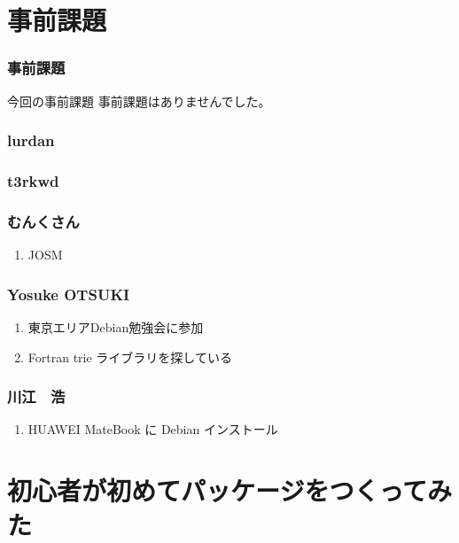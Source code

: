 \documentclass[cjk,dvipdfmx,10pt,compress,%
hyperref={bookmarks=true,bookmarksnumbered=true,bookmarksopen=false,%
colorlinks=false,%
pdftitle={第 114 回 関西 Debian 勉強会},%
pdfauthor={倉敷・のがた・佐々木・かわだ},%
pdfsubject={資料},%
}]{beamer}
\begin{document}

\section{事前課題}

\begin{frame}[fragile]
  \frametitle{事前課題}
  \begin{block}{今回の事前課題}
    事前課題はありませんでした。
  \end{block}
\end{frame}


\begin{frame}
  \frametitle{ lurdan }
\end{frame}

\begin{frame}
  \frametitle{ t3rkwd }
\end{frame}

\begin{frame}
  \frametitle{ むんくさん }
  \begin{enumerate}
  \item JOSM
  \end{enumerate}
\end{frame}

\begin{frame}
  \frametitle{ Yosuke OTSUKI }
  \begin{enumerate}
  \item 東京エリアDebian勉強会に参加
  \item Fortran trie ライブラリを探している
  \end{enumerate}
\end{frame}

\begin{frame}
  \frametitle{ 川江　浩 }
  \begin{enumerate}
  \item HUAWEI MateBook に Debian インストール
  \end{enumerate}
\end{frame}


\section{初心者が初めてパッケージをつくってみた}
\end{document}
